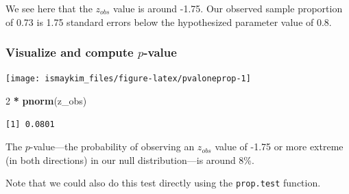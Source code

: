 \documentclass[12pt,]{krantz}
\makeatletter
\newenvironment{Shaded}{\begin{snugshade}}{\end{snugshade}}
\newcommand{\KeywordTok}[1]{\textcolor[rgb]{0.27,0.27,0.27}{\textbf{#1}}}
\newcommand{\DataTypeTok}[1]{\textcolor[rgb]{0.27,0.27,0.27}{#1}}
\newcommand{\DecValTok}[1]{\textcolor[rgb]{0.06,0.06,0.06}{#1}}
\newcommand{\FloatTok}[1]{\textcolor[rgb]{0.06,0.06,0.06}{#1}}
\newcommand{\StringTok}[1]{\textcolor[rgb]{0.5,0.5,0.5}{#1}}
\newcommand{\OperatorTok}[1]{\textcolor[rgb]{0.43,0.43,0.43}{\textbf{#1}}}
\newcommand{\NormalTok}[1]{#1}
\newenvironment{kframe}{%
\medskip{}
\setlength{\fboxsep}{.8em}
 \def\at@end@of@kframe{}%
 \ifinner\ifhmode%
  \def\at@end@of@kframe{\end{minipage}}%
  \begin{minipage}{\columnwidth}%
 \fi\fi%
 \def\FrameCommand##1{\hskip\@totalleftmargin \hskip-\fboxsep
 \colorbox{shadecolor}{##1}\hskip-\fboxsep
     \hskip-\linewidth \hskip-\@totalleftmargin \hskip\columnwidth}%
 \MakeFramed {\advance\hsize-\width
   \@totalleftmargin\z@ \linewidth\hsize
   \@setminipage}}%
 {\par\unskip\endMakeFramed%
 \at@end@of@kframe}
\renewenvironment{Shaded}{\begin{kframe}}{\end{kframe}}
\theoremstyle{definition}
\theoremstyle{definition}
\theoremstyle{definition}
\theoremstyle{remark}
\makeatother
\begin{document}
We see here that the \(z_{obs}\) value is around -1.75. Our observed
sample proportion of 0.73 is 1.75 standard errors below the hypothesized
parameter value of 0.8.

\subsubsection*{\texorpdfstring{Visualize and compute
\(p\)-value}{Visualize and compute p-value}}\label{visualize-and-compute-p-value}


\begin{Shaded}
\end{Shaded}

\begin{center}\texttt{[image: ismaykim\_files/figure-latex/pvaloneprop-1]} \end{center}

\begin{Shaded}
\begin{Highlighting}[]
\DecValTok{2} \OperatorTok{*}\StringTok{ }\KeywordTok{pnorm}\NormalTok{(z_obs)}
\end{Highlighting}
\end{Shaded}

\begin{verbatim}
[1] 0.0801
\end{verbatim}

The \(p\)-value---the probability of observing an \(z_{obs}\) value of
-1.75 or more extreme (in both directions) in our null distribution---is
around 8\%.

Note that we could also do this test directly using the
\texttt{prop.test} function.
\end{document}
